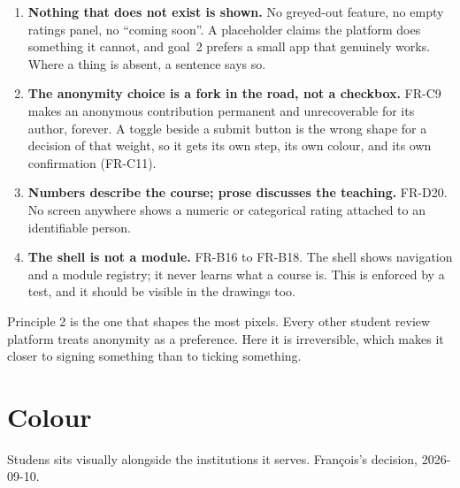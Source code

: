 \documentclass[11pt,a4paper]{article}
\begin{document}
\begin{enumerate}[leftmargin=*,itemsep=2mm]
\item \textbf{Nothing that does not exist is shown.} No greyed-out feature, no
  empty ratings panel, no ``coming soon''. A placeholder claims the platform
  does something it cannot, and goal~2 prefers a small app that genuinely
  works. Where a thing is absent, a sentence says so.

\item \textbf{The anonymity choice is a fork in the road, not a checkbox.}
  FR-C9 makes an anonymous contribution permanent and unrecoverable for its
  author, forever. A toggle beside a submit button is the wrong shape for a
  decision of that weight, so it gets its own step, its own colour, and its own
  confirmation (FR-C11).

\item \textbf{Numbers describe the course; prose discusses the teaching.}
  FR-D20. No screen anywhere shows a numeric or categorical rating attached to
  an identifiable person.

\item \textbf{The shell is not a module.} FR-B16 to FR-B18. The shell shows
  navigation and a module registry; it never learns what a course is. This is
  enforced by a test, and it should be visible in the drawings too.
\end{enumerate}

\begin{why}
Principle 2 is the one that shapes the most pixels. Every other student review
platform treats anonymity as a preference. Here it is irreversible, which makes
it closer to signing something than to ticking something.
\end{why}

\section{Colour}

Studens sits visually alongside the institutions it serves. François's
decision, 2026-09-10.
\end{document}
